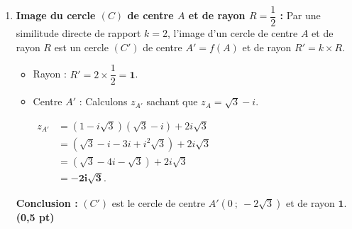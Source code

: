 \documentclass[12pt,a4paper]{article}
\begin{document}
\begin{enumerate}
\begin{enumerate}
\begin{itemize}
            Son image $C'$ a pour affixe :
            
            $
            \begin{aligned}
            z_{C'} &= (1-i\sqrt{3})i + 2i\sqrt{3}\\
                   &= i - i^2\sqrt{3} + 2i\sqrt{3}\\
                   &= \sqrt{3} + 3i\sqrt{3}.
            \end{aligned}$ 
            
            Donc $C'(\sqrt{3} \ ; \ 3\sqrt{3})$.
            \item Si $y = 0$, $x = -1 \implies D(-1) \in (\Delta)$. Son image $D'$ a pour affixe :
            
            $
            \begin{aligned}
            z_{D'} &= (1-i\sqrt{3})(-1) + 2i\sqrt{3} \\
                   &= -1 + i\sqrt{3} + 2i\sqrt{3} \\
                   &= -1 + 3i\sqrt{3}
            \end{aligned}$ . 
            
            Donc $D'(-1 \ ; \ 3\sqrt{3})$.
        \end{itemize}
        On remarque que $C'$ et $D'$ ont la même ordonnée $y = 3\sqrt{3}$. La droite $(\Delta')$ passant par ces deux points est donc une droite horizontale.
        
        L'équation de $(\Delta')$ est : $\mathbf{y - 3\sqrt{3} = 0}$. \hfill \textbf{(0,5 pt)}

        \item \textbf{Image du cercle $(C)$ de centre $A$ et de rayon $R = \dfrac{1}{2}$ :}
        Par une similitude directe de rapport $k=2$, l'image d'un cercle de centre $A$ et de rayon $R$ est un cercle $(C')$ de centre $A'=f(A)$ et de rayon $R' = k \times R$.
        \begin{itemize}
            \item Rayon : $R' = 2 \times \dfrac{1}{2} = \mathbf{1}$.
            \item Centre $A'$ : Calculons $z_{A'}$ sachant que $z_A = \sqrt{3}-i$.
            
            $
            \begin{aligned}
                z_{A'} &= (1-i\sqrt{3})(\sqrt{3}-i) + 2i\sqrt{3} \\
                &= (\sqrt{3} - i - 3i + i^2\sqrt{3}) + 2i\sqrt{3} \\
                &= (\sqrt{3} - 4i - \sqrt{3}) + 2i\sqrt{3} \\
                &= \mathbf{-2i\sqrt{3}}.
            \end{aligned}
            $
            
        \end{itemize}
        \textbf{Conclusion :} $(C')$ est le cercle de centre $A'(0 \ ; \ -2\sqrt{3})$ et de rayon $\mathbf{1}$. \hfill \textbf{(0,5 pt)}
    \end{enumerate}
\end{enumerate}
\end{document}
